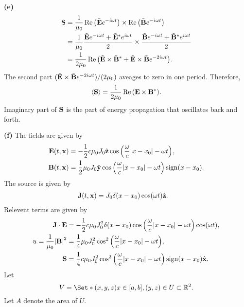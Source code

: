\documentclass{article}
\makeatletter
\newcommand*{\shifttext}[1]{%
  \settowidth{\@tempdima}{#1}%
  \hspace{-\@tempdima}#1%
}
\newcommand{\plabel}[1]{%
\shifttext{\textbf{#1}\quad}%
}
\newcommand{\minusbaseline}{\abovedisplayskip=0pt\abovedisplayshortskip=0pt~\vspace*{-\baselineskip}}%
\makeatother
\begin{document}
\plabel{(e)}%
\begingroup\minusbaseline
\begin{align*}
    \vb{S} &= \frac{1}{\mu_0}\Re \qty(\tilde{\vb{E}}e^{-i\omega t}) \times \Re \qty(\tilde{\vb{B}} e^{-i\omega t}) \\
    &= \frac{1}{\mu_0} \frac{\tilde{\vb{E}}e^{-i\omega t} + \tilde{\vb{E}}^*e^{i\omega t}}{2}\times \frac{\tilde{\vb{B}}e^{-i\omega t} + \tilde{\vb{B}}^*e^{i\omega t}}{2} \\
    &= \frac{1}{2\mu_0}\Re\qty(\tilde{\vb{E}}\times \tilde{\vb{B}}^* + \tilde{\vb{E}}\times \tilde{\vb{B}} e^{-2i\omega t}).
\end{align*}
\endgroup
The second part $(\tilde{\vb{E}}\times\tilde{\vb{B}}e^{-2i\omega t})/(2\mu_0)$ aveages to zero in one period.
Therefore,
\[ \langle \vb{S} \rangle = \frac{1}{2\mu_0} \Re\qty(\vb{E}\times\vb{B}^*). \]
Imaginary part of $\vb{S}$ is the part of energy propagation that oscillates back and forth.

\plabel{(f)}%
The fields are given by
\begin{align*}
    \vb{E}(t,\vb{x}) &= -\frac{1}{2} c \mu_0 J_0 \hat{\vb{z}} \cos \qty(\frac{\omega}{c}\abs{x-x_0} - \omega t), \\
    \vb{B}(t,\vb{x}) &= \frac{1}{2} \mu_0 J_0 \hat{\vb{y}} \cos \qty(\frac{\omega}{c}\abs{x-x_0} - \omega t)\operatorname{sign}(x-x_0).
\end{align*}
The source is given by
\begin{align*}
    \vb{J}(t,\vb{x}) &= J_0 \delta(x-x_0) \cos(\omega t)\hat{\vb{z}}.
\end{align*}
Relevent terms are given by
\begin{align*}
    \vb{J}\cdot \vb{E} &= -\frac{1}{2} c \mu_0 J_0^2 \delta(x-x_0) \cos \qty(\frac{\omega}{c}\abs{x-x_0} - \omega t)\cos(\omega t),\\
    u = \frac{1}{\mu_0}\abs{\vb{B}}^2 &= \frac{1}{4} \mu_0 J_0^2 \cos^2 \qty(\frac{\omega}{c}\abs{x-x_0} - \omega t), \\
    \vb{S} &= \frac{1}{4} c\mu_0  J_0^2 \cos^2 \qty(\frac{\omega}{c}\abs{x-x_0} - \omega t) \operatorname{sign}(x-x_0) \hat{\vb{x}}.
\end{align*}
Let
\[ V = \Set*{(x,y,z)}{x\in[a,b],(y,z)\in U\subset \mathbb{R}^2}. \]
Let $A$ denote the area of $U$.
\end{document}
